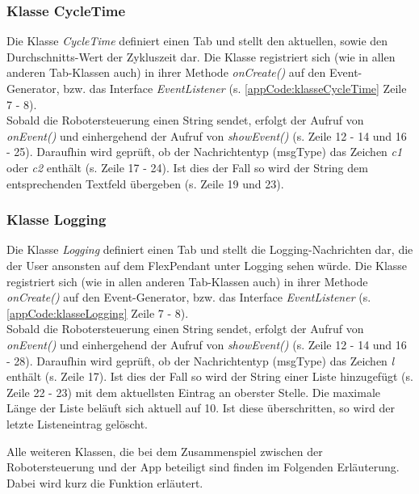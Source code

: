 \subsubsection{Klasse CycleTime}
Die Klasse \textit{CycleTime} definiert einen Tab und stellt den 
aktuellen, sowie den Durchschnitts-Wert der Zykluszeit dar. Die Klasse 
registriert sich (wie in allen anderen 
Tab-Klassen auch) in ihrer 
Methode \textit{onCreate()} auf den Event-Generator, bzw. das Interface 
\textit{EventListener} (s. \ref{appCode:klasseCycleTime} Zeile 7 - 8).\\
Sobald die Robotersteuerung einen String sendet, erfolgt der Aufruf von 
\textit{onEvent()} und einhergehend der Aufruf von \textit{showEvent()} (s. 
Zeile 12 - 14 und 16 - 25). Daraufhin wird geprüft, ob der Nachrichtentyp 
(msgType) das Zeichen \textit{c1} oder \textit{c2} enthält (s. Zeile 17 - 24). 
Ist dies der Fall so wird der 
String dem entsprechenden Textfeld übergeben (s. Zeile 19 und 23).



\subsubsection{Klasse Logging}
Die Klasse \textit{Logging} definiert einen Tab und stellt die 
Logging-Nachrichten dar, die der User ansonsten auf dem FlexPendant unter 
Logging 
sehen würde. Die Klasse registriert sich (wie in allen anderen 
Tab-Klassen auch) in ihrer 
Methode \textit{onCreate()} auf den Event-Generator, bzw. das Interface 
\textit{EventListener} (s. \ref{appCode:klasseLogging} Zeile 7 - 8).\\
Sobald die Robotersteuerung einen String sendet, erfolgt der Aufruf von 
\textit{onEvent()} und einhergehend der Aufruf von \textit{showEvent()} (s. 
Zeile 12 - 14 und 16 - 28). Daraufhin wird geprüft, ob der Nachrichtentyp 
(msgType) das Zeichen \textit{l} enthält (s. Zeile 17). 
Ist dies der Fall so wird der 
String einer Liste hinzugefügt (s. Zeile 22 - 23) mit dem aktuellsten Eintrag 
an oberster Stelle. Die maximale Länge der Liste beläuft sich aktuell auf 10. 
Ist diese überschritten, so wird der letzte Listeneintrag gelöscht.



Alle weiteren Klassen, die bei dem Zusammenspiel zwischen der Robotersteuerung 
und der App beteiligt sind finden im Folgenden Erläuterung. Dabei wird kurz die 
Funktion erläutert.

